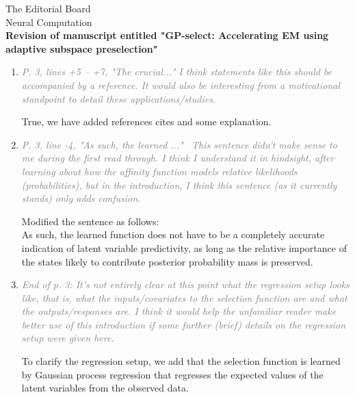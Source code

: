 \documentclass[10pt]{letter}
\newcommand{\rvr}[1]{\textcolor{gray}{#1}}
\newcommand{\rev}[1]{\textcolor{blue}{#1}}
\begin{document}
\begin{letter}{
The Editorial Board\\
Neural Computation\\
\vspace{10mm}
\textbf{Revision of manuscript entitled "GP-select: Accelerating EM using adaptive
subspace preselection"}
}
\begin{enumerate}[topsep=3pt,itemsep=2ex,partopsep=1ex,parsep=1ex]
We have added illustrative examples to the introduction in order to provide an early intuition for the used approach. We also motivate sparsity with two examples in Sec. 5.1 as suggested, provided more explanation to Sec. 5.3, and added pointers to potential application domains / typical tasks in introduction and Sec. 5.1. We agree that providing such examples and their task contexts makes our motivation clearer, and believe that our changes have improved the manuscript accordingly.
    
    \item \rvr{\emph{P. 3, lines +5 -- +7, "The crucial..."  I think statements like this should be accompanied by a reference. It would also be interesting from a motivational standpoint to detail these applications/studies.}}

True, we have added references cites and some explanation.

    \item \rvr{\emph{P. 3, line -4, "As such, the learned ..."  This sentence didn’t make sense to me during the first read through. I think I understand it in hindsight, after learning about how the affinity function models relative likelihoods (probabilities), but in the introduction, I think this sentence (as it currently stands) only adds confusion.}}

Modified the sentence as follows: \\
As such, the learned function does not have to be a completely accurate
indication of latent variable predictivity, as long as the relative importance of the states
likely to contribute posterior probability mass is preserved.

    \item \rvr{\emph{End of p. 3: It's not entirely clear at this point what the regression setup looks like, that is, what the inputs/covariates to the selection function are and what the outputs/responses are. I think it would help the unfamiliar reader make better use of this introduction if some further (brief) details on the regression setup were given here.}}

To clarify the regression setup, we add that the selection function is learned by Gaussian process regression that regresses the expected values of the latent variables from the observed data.


\end{enumerate}
\end{letter}
\end{document}
